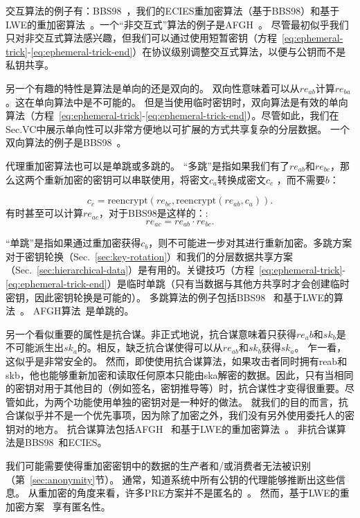 \documentclass[longbibliography,nofootinbib]{revtex4-1}
\begin{document}
交互算法的例子有：BBS98~\cite{BBS98}，我们的ECIES重加密算法（基于BBS98）和基于LWE的重加密算法~\cite{lwe-reencryption}。一个“非交互式”算法的例子是AFGH~\cite{AFGH}。 尽管最初似乎我们只对非交互式算法感兴趣，但我们可以通过使用短暂密钥（方程~\ref{eq:ephemeral-trick}-\ref{eq:ephemeral-trick-end}）在协议级别调整交互式算法，以便与公钥而不是私钥共享。

另一个有趣的特性是算法是单向的还是双向的。 双向性意味着可以从$re_{ab}$计算$re_{ba}$。这在单向算法中是不可能的。 但是当使用临时密钥时，双向算法是有效的单向算法（方程~\ref{eq:ephemeral-trick}-\ref{eq:ephemeral-trick-end}）。尽管如此，我们在Sec.VC中展示单向性可以非常方便地以可扩展的方式共享复杂的分层数据。 一个双向算法的例子是BBS98~\cite{BBS98}。

    代理重加密算法也可以是单跳或多跳的。 “多跳”是指如果我们有了$re_{ab}$和$re_{bc}$，那么这两个重新加密的密钥可以串联使用，将密文$c_a$转换成密文$c_c$ ，而不需要$b$：

\begin{equation}
    c_c = \text{reencrypt}(re_{bc}, \text{reencrypt}(re_{ab}, c_a)).
\end{equation}
有时甚至可以计算$re_{ac}$，对于BBS98是这样的：:
\begin{equation}
    re_{ac} = re_{ab} \cdot re_{bc}.
\end{equation}

“单跳”是指如果通过重加密获得$c_b$，则不可能进一步对其进行重新加密。多跳方案对于密钥轮换（Sec.~\ref{sec:key-rotation}）和我们的分层数据共享方案（Sec.~\ref{sec:hierarchical-data}）是有用的。关键技巧（方程~\ref{eq:ephemeral-trick}-\ref{eq:ephemeral-trick-end}）是临时单跳（只有当数据与其他方共享时才会创建临时密钥，因此密钥轮换是可能的）。 多跳算法的例子包括BBS98~\cite{BBS98} 和基于LWE的算法~\cite{lwe-reencryption}。 AFGH算法~\cite{AFGH}是单跳的。

另一个看似重要的属性是抗合谋。非正式地说，抗合谋意味着只获得$re_ab$和$sk_b$是不可能派生出$sk_a$的。相反，缺乏抗合谋使得可以从$re_{ab}$和$sk_b$获得$sk_a$。 乍一看，这似乎是非常安全的。 然而，即使使用抗合谋算法，如果攻击者同时拥有reab和skb，他也能够重新加密和读取任何原本只能由ska解密的数据。因此，只有当相同的密钥对用于其他目的（例如签名，密钥推导等）时，抗合谋性才变得很重要。尽管如此，为两个功能使用单独的密钥对是一种好的做法。 就我们的目的而言，抗合谋似乎并不是一个优先事项，因为除了加密之外，我们没有另外使用委托人的密钥对的地方。 抗合谋算法包括AFGH~\cite{AFGH} 和基于LWE的重加密算法~\cite{lwe-reencryption}。 非抗合谋算法是BBS98~\cite{BBS98}和ECIES。


我们可能需要使得重加密密钥中的数据的生产者和/或消费者无法被识别（第~\ref{sec:anonymity}节）。 通常，知道系统中所有公钥的代理能够推断出这些信息。 从重加密的角度来看，许多PRE方案并不是匿名的~\cite{BBS98,AFGH}。 然而，基于LWE的重加密方案 ~\cite{lwe-reencryption}享有匿名性。
\end{document}
